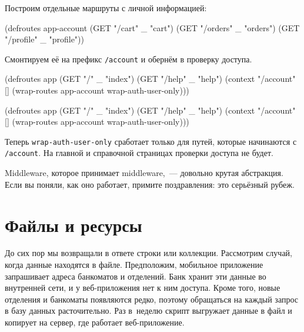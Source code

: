 Построим отдельные маршруты с личной информацией:

\begin{english}
  \begin{clojure}
(defroutes app-account
  (GET "/cart"    _ "cart")
  (GET "/orders"  _ "orders")
  (GET "/profile" _ "profile"))
  \end{clojure}
\end{english}

\noindent
Смонтируем её на префикс \verb|/account| и обернём в проверку доступа.

\ifx\DEVICETYPE\MOBILE

\begin{english}
  \begin{clojure}
(defroutes app
  (GET "/"     _ "index")
  (GET "/help" _ "help")
  (context "/account" []
    (wrap-routes app-account
                 wrap-auth-user-only)))
  \end{clojure}
\end{english}

\else

\begin{english}
  \begin{clojure}
(defroutes app
  (GET "/"     _ "index")
  (GET "/help" _ "help")
  (context "/account" []
    (wrap-routes app-account wrap-auth-user-only)))
  \end{clojure}
\end{english}

\fi


Теперь \verb|wrap-auth-user-only| сработает только для путей, которые
начинаются с \verb|/account|. На главной и справочной страницах проверки
доступа не будет.

Middleware, которое принимает middleware,~--- довольно крутая абстракция. Если вы
поняли, как оно работает, примите поздравления: это серьёзный рубеж.

\section{Файлы и ресурсы}

\label{http-files}

До сих пор мы возвращали в ответе строки или коллекции. Рассмотрим случай, когда
данные находятся в файле. Предположим, мобильное приложение запрашивает адреса
банкоматов и отделений. Банк хранит эти данные во внутренней сети, и у
веб-приложения нет к ним доступа. Кроме того, новые отделения и банкоматы
появляются редко, поэтому обращаться на каждый запрос в базу данных
расточительно. Раз в~неделю скрипт выгружает данные в файл и копирует на сервер,
где работает веб-приложение.

